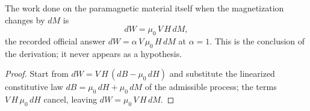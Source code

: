 \begin{theorem}
\label{thm:IPhO2026Problems_problem_IPhO_2026_3_A_3:dW_eq_mu0_V_H_dM}
The work done on the paramagnetic material itself when the magnetization
changes by $dM$ is
\[ dW = \mu_0\,V\,H\,dM, \]
the recorded official answer $dW = \alpha\,V\,\mu_0\,H\,dM$ at $\alpha = 1$.
This is the conclusion of the derivation; it never appears as a hypothesis.
\end{theorem}
\begin{proof}
Start from $dW = V\,H\,(dB - \mu_0\,dH)$ and substitute the linearized
constitutive law $dB = \mu_0\,dH + \mu_0\,dM$ of the admissible process;
the terms $V\,H\,\mu_0\,dH$ cancel, leaving $dW = \mu_0\,V\,H\,dM$.
\end{proof}
